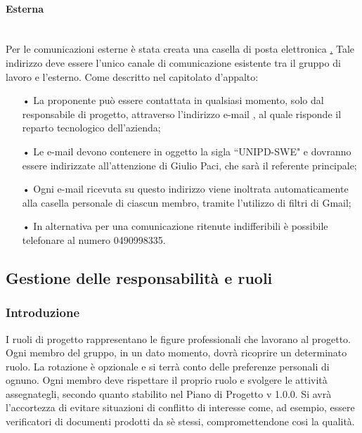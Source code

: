 \paragraph{Esterna}\mbox{}\\
Per le comunicazioni esterne è stata creata una casella di posta elettronica \href{SWEight@gmail.com}.
\newline 
Tale indirizzo deve essere l'unico canale di comunicazione esistente tra il gruppo di lavoro e l'esterno. 
\newline
Come descritto nel capitolato d'appalto: 
\begin{itemize}
\item[•] La proponente può essere contattata in qualsiasi momento, solo dal responsabile di progetto, attraverso l'indirizzo e-mail \href{tech@mivoq.it} , al quale risponde il reparto tecnologico dell'azienda;
\item[•] Le e-mail devono contenere in oggetto la sigla “UNIPD-SWE" e dovranno essere indirizzate all'attenzione di Giulio Paci, che sarà il referente principale;
\item[•] Ogni e-mail ricevuta su questo indirizzo viene inoltrata automaticamente alla casella personale di ciascun membro, tramite l'utilizzo di filtri di Gmail;
\item[•] In alternativa per una comunicazione ritenute indifferibili è possibile telefonare al numero 0490998335.
\end{itemize}

\subsection{Gestione delle responsabilità e ruoli}

\subsubsection{Introduzione}
I ruoli di progetto rappresentano le figure professionali che lavorano al progetto. Ogni membro del gruppo, in un dato momento, dovrà ricoprire un determinato ruolo.  
\newline
La rotazione è opzionale e si terrà conto delle preferenze personali di ognuno. Ogni membro deve rispettare il proprio ruolo e svolgere le attività assegnategli, secondo quanto stabilito nel Piano di Progetto v 1.0.0. Si avrà l'accortezza di evitare situazioni di conflitto di interesse come, ad esempio, essere verificatori di documenti prodotti da sè stessi, compromettendone cosi la qualità.

